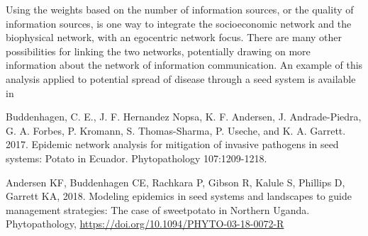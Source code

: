\documentclass[]{article}
\begin{document}
Using the weights based on the number of information sources, or the
quality of information sources, is one way to integrate the
socioeconomic network and the biophysical network, with an egocentric
network focus. There are many other possibilities for linking the two
networks, potentially drawing on more information about the network of
information communication. An example of this analysis applied to
potential spread of disease through a seed system is available in

Buddenhagen, C. E., J. F. Hernandez Nopsa, K. F. Andersen, J.
Andrade-Piedra, G. A. Forbes, P. Kromann, S. Thomas-Sharma, P. Useche,
and K. A. Garrett. 2017. Epidemic network analysis for mitigation of
invasive pathogens in seed systems: Potato in Ecuador. Phytopathology
107:1209-1218.

Andersen KF, Buddenhagen CE, Rachkara P, Gibson R, Kalule S, Phillips D,
Garrett KA, 2018. Modeling epidemics in seed systems and landscapes to
guide management strategies: The case of sweetpotato in Northern Uganda.
Phytopathology, \url{https://doi.org/10.1094/PHYTO-03-18-0072-R}
\end{document}
